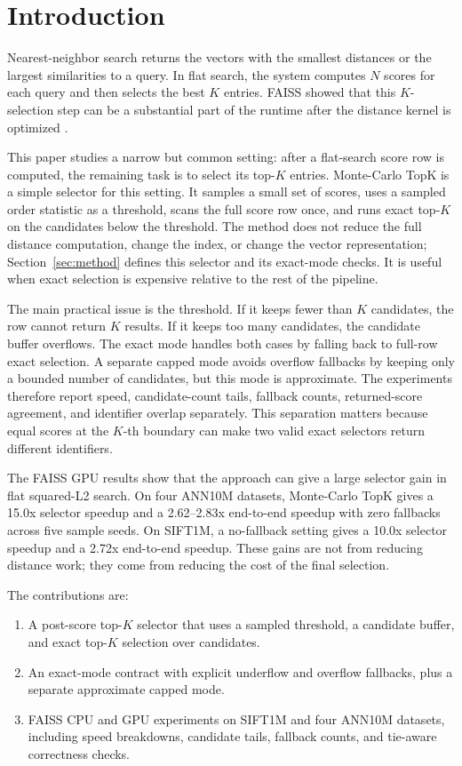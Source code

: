 \section{Introduction}

Nearest-neighbor search returns the vectors with the smallest distances or the
largest similarities to a query. In flat search, the system computes $N$ scores
for each query and then selects the best $K$ entries. FAISS showed that this
$K$-selection step can be a substantial part of the runtime after the distance
kernel is optimized \citep{johnson2019billion,douze2024faiss}.

This paper studies a narrow but common setting: after a flat-search score row is
computed, the remaining task is to select its top-$K$ entries. Monte-Carlo TopK
is a simple selector for this setting. It samples a small set of scores, uses a
sampled order statistic as a threshold, scans the full score row once, and runs
exact top-$K$ on the candidates below the threshold. The method does not reduce
the full distance computation, change the index, or change the vector representation;
Section~\ref{sec:method} defines this selector and its exact-mode checks. It is
useful when exact selection is expensive relative to the rest of the pipeline.

The main practical issue is the threshold. If it keeps fewer than $K$
candidates, the row cannot return $K$ results. If it keeps too many candidates,
the candidate buffer overflows. The exact mode handles both cases by falling
back to full-row exact selection. A separate capped mode avoids overflow
fallbacks by keeping only a bounded number of candidates, but this mode is
approximate. The experiments therefore report speed, candidate-count tails,
fallback counts, returned-score agreement, and identifier overlap separately.
This separation matters because equal scores at the $K$-th boundary can make two
valid exact selectors return different identifiers.

The FAISS GPU results show that the approach can give a large selector gain in
flat squared-L2 search. On four ANN10M datasets, Monte-Carlo TopK gives a 15.0x
selector speedup and a 2.62--2.83x end-to-end speedup with zero fallbacks across
five sample seeds. On SIFT1M, a no-fallback setting gives a 10.0x selector
speedup and a 2.72x end-to-end speedup. These gains are not from reducing
distance work; they come from reducing the cost of the final selection.

The contributions are:

\begin{enumerate}
  \item A post-score top-$K$ selector that uses a sampled threshold, a candidate
        buffer, and exact top-$K$ selection over candidates.
  \item An exact-mode contract with explicit underflow and overflow fallbacks,
        plus a separate approximate capped mode.
  \item FAISS CPU and GPU experiments on SIFT1M and four ANN10M datasets,
        including speed breakdowns, candidate tails, fallback counts, and
        tie-aware correctness checks.
\end{enumerate}
